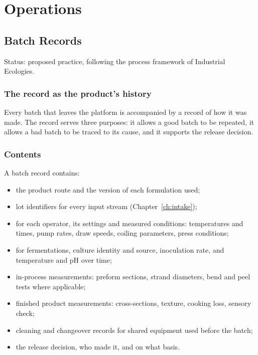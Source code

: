 \documentclass[11pt,openany]{book}
\theoremstyle{definition}
\begin{document}
\part{Operations}

\chapter{Batch Records}\label{ch:batch}

Status: proposed practice, following the process framework of Industrial Ecologies.

\section{The record as the product's history}

Every batch that leaves the platform is accompanied by a record of how it was made. The record serves three purposes: it allows a good batch to be repeated, it allows a bad batch to be traced to its cause, and it supports the release decision.

\section{Contents}

A batch record contains:

\begin{itemize}
\item the product route and the version of each formulation used;
\item lot identifiers for every input stream (Chapter~\ref{ch:intake});
\item for each operator, its settings and measured conditions: temperatures and times, pump rates, draw speeds, coiling parameters, press conditions;
\item for fermentations, culture identity and source, inoculation rate, and temperature and pH over time;
\item in-process measurements: preform sections, strand diameters, bend and peel tests where applicable;
\item finished product measurements: cross-sections, texture, cooking loss, sensory check;
\item cleaning and changeover records for shared equipment used before the batch;
\item the release decision, who made it, and on what basis.
\end{itemize}
\end{document}
